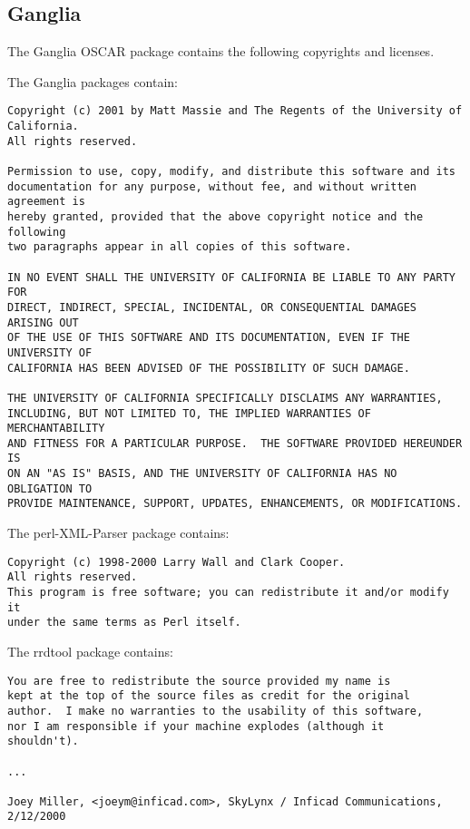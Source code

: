 %
%
%

\subsection{Ganglia}
The Ganglia OSCAR package contains the following copyrights and licenses.

The Ganglia packages contain:

\begin{verbatim}
Copyright (c) 2001 by Matt Massie and The Regents of the University of California.
All rights reserved.

Permission to use, copy, modify, and distribute this software and its
documentation for any purpose, without fee, and without written agreement is
hereby granted, provided that the above copyright notice and the following
two paragraphs appear in all copies of this software.

IN NO EVENT SHALL THE UNIVERSITY OF CALIFORNIA BE LIABLE TO ANY PARTY FOR
DIRECT, INDIRECT, SPECIAL, INCIDENTAL, OR CONSEQUENTIAL DAMAGES ARISING OUT
OF THE USE OF THIS SOFTWARE AND ITS DOCUMENTATION, EVEN IF THE UNIVERSITY OF
CALIFORNIA HAS BEEN ADVISED OF THE POSSIBILITY OF SUCH DAMAGE.

THE UNIVERSITY OF CALIFORNIA SPECIFICALLY DISCLAIMS ANY WARRANTIES,
INCLUDING, BUT NOT LIMITED TO, THE IMPLIED WARRANTIES OF MERCHANTABILITY
AND FITNESS FOR A PARTICULAR PURPOSE.  THE SOFTWARE PROVIDED HEREUNDER IS
ON AN "AS IS" BASIS, AND THE UNIVERSITY OF CALIFORNIA HAS NO OBLIGATION TO
PROVIDE MAINTENANCE, SUPPORT, UPDATES, ENHANCEMENTS, OR MODIFICATIONS.
\end{verbatim}

The perl-XML-Parser package contains:

\begin{verbatim}
Copyright (c) 1998-2000 Larry Wall and Clark Cooper.
All rights reserved.
This program is free software; you can redistribute it and/or modify it
under the same terms as Perl itself.
\end{verbatim}

The rrdtool package contains:

\begin{verbatim}
You are free to redistribute the source provided my name is
kept at the top of the source files as credit for the original
author.  I make no warranties to the usability of this software,
nor I am responsible if your machine explodes (although it
shouldn't).

...

Joey Miller, <joeym@inficad.com>, SkyLynx / Inficad Communications,
2/12/2000
\end{verbatim}
